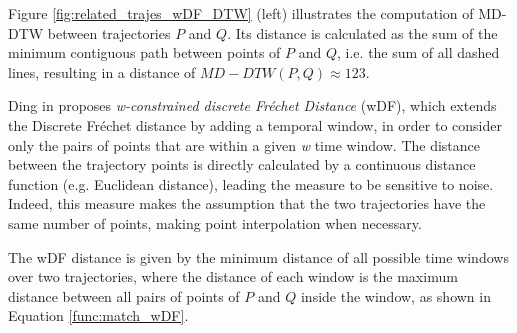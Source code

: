 \documentclass[12pt]{article}
\begin{document}
Figure \ref{fig:related_trajes_wDF_DTW} (left) illustrates the computation of MD-DTW between trajectories $P$ and $Q$. Its distance is calculated as the sum of the minimum contiguous path between points of $P$ and $Q$, i.e. the sum of all dashed lines, resulting in a distance of $MD-DTW(P, Q) \approx 123$.


Ding in \cite{Ding:2008:ESJ:1440463.1440989} proposes \emph{w-constrained discrete Fr{\'e}chet Distance} (wDF), which extends the Discrete Fr{\'e}chet distance \cite{eiter1994computing} by adding a temporal window, in order to consider only the pairs of points that are within a given \emph{w} time window. The distance between the trajectory points is directly calculated by a continuous distance function (e.g. Euclidean distance), leading the measure to be sensitive to noise. Indeed, this measure makes the assumption that the two trajectories have the same number of points, making point interpolation when necessary.

The wDF distance is given by the minimum distance of all possible time windows over two trajectories, where the distance of each window is the maximum distance between all pairs of points of $P$ and $Q$  inside the window, as shown in Equation \ref{func:match_wDF}.
\end{document}
